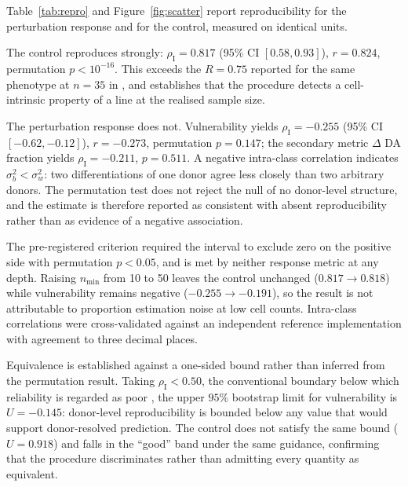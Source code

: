 \documentclass[5p,times,twocolumn]{elsarticle}
\begin{document}
Table~\ref{tab:repro} and Figure~\ref{fig:scatter} report reproducibility for
the perturbation response and for the control, measured on identical units.

The control reproduces strongly: $\rho_\mathrm{I}=0.817$ (95\% CI
$[0.58,0.93]$), $r=0.824$, permutation $p<10^{-16}$. This exceeds the
$R=0.75$ reported for the same phenotype at $n=35$ in
\cite{jerber2021population}, and establishes that the procedure detects a
cell-intrinsic property of a line at the realised sample size.

The perturbation response does not. Vulnerability yields
$\rho_\mathrm{I}=-0.255$ (95\% CI $[-0.62,-0.12]$), $r=-0.273$, permutation
$p=0.147$; the secondary metric $\Delta$ DA fraction yields
$\rho_\mathrm{I}=-0.211$, $p=0.511$. A negative intra-class correlation
indicates $\sigma_b^2<\sigma_w^2$: two differentiations of one donor agree less
closely than two arbitrary donors. The permutation test does not reject the null
of no donor-level structure, and the estimate is therefore reported as
consistent with absent reproducibility rather than as evidence of a negative
association.

The pre-registered criterion required the interval to exclude zero on the
positive side with permutation $p<0.05$, and is met by neither response metric
at any depth. Raising $n_{\min}$ from 10 to 50 leaves the control unchanged
($0.817 \to 0.818$) while vulnerability remains negative ($-0.255 \to -0.191$),
so the result is not attributable to proportion estimation noise at low cell
counts. Intra-class correlations were cross-validated against an independent
reference implementation with agreement to three decimal places.

Equivalence is established against a one-sided bound rather than inferred from
the permutation result. Taking $\rho_\mathrm{I}<0.50$, the conventional boundary
below which reliability is regarded as poor \cite{koo2016guideline}, the upper
$95\%$ bootstrap limit for vulnerability is $U=-0.145$: donor-level
reproducibility is bounded below any value that would support donor-resolved
prediction. The control does not satisfy the same bound ($U=0.918$) and falls in
the ``good'' band under the same guidance, confirming that the procedure
discriminates rather than admitting every quantity as equivalent.

\end{document}
